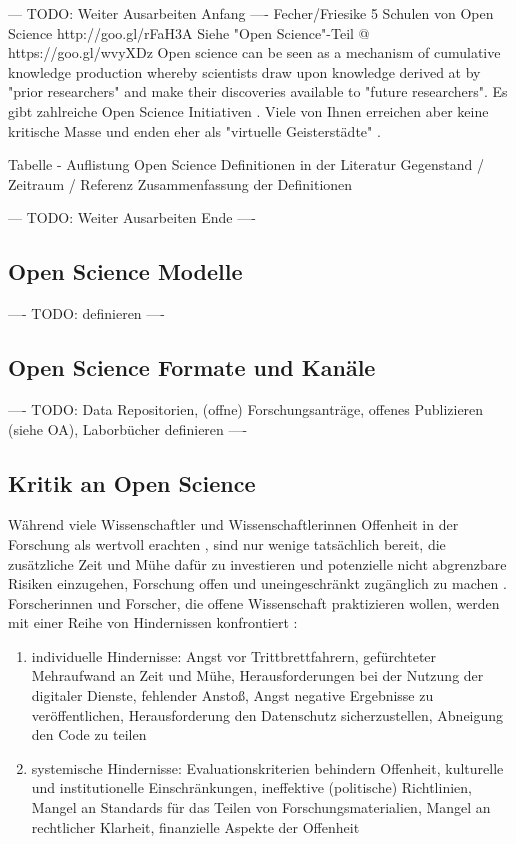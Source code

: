 --- TODO: Weiter Ausarbeiten Anfang ----
Fecher/Friesike 5 Schulen von Open Science http://goo.gl/rFaH3A
Siehe "Open Science"-Teil @ https://goo.gl/wvyXDz
Open science can be seen as a mechanism of cumulative knowledge production whereby scientists draw upon knowledge derived at by "prior researchers" and make their discoveries available to "future researchers". \cite{Mukherjee_2009}
Es gibt zahlreiche Open Science Initiativen \cite{Scheliga_2014}. Viele von Ihnen erreichen aber keine kritische Masse \cite{wrap_2010} und enden eher als "virtuelle Geisterstädte" \cite{Nielsen_2011}.

Tabelle - Auflistung Open Science Definitionen in der Literatur
Gegenstand / Zeitraum / Referenz
Zusammenfassung der Definitionen

--- TODO: Weiter Ausarbeiten Ende ----

\subsection{Open Science Modelle}
---- TODO: definieren ----

\subsection{Open Science Formate und Kanäle}

---- TODO: Data Repositorien, (offne) Forschungsanträge, offenes Publizieren (siehe OA), Laborbücher definieren ----

\subsection{Kritik an Open Science}

Während viele Wissenschaftler und Wissenschaftlerinnen Offenheit in der Forschung als wertvoll erachten \cite{suchen}, sind nur wenige tatsächlich bereit, die zusätzliche Zeit und Mühe dafür zu investieren und potenzielle nicht abgrenzbare Risiken einzugehen, Forschung offen und uneingeschränkt zugänglich zu machen \cite{Scheliga_2014} \cite{Procter_2010}. Forscherinnen und Forscher, die offene Wissenschaft praktizieren wollen, werden mit einer Reihe von Hindernissen konfrontiert \cite{Scheliga_2014}:
\begin{enumerate}
\item individuelle Hindernisse: Angst vor Trittbrettfahrern, gefürchteter Mehraufwand an Zeit und Mühe, Herausforderungen bei der Nutzung der digitaler Dienste, fehlender Anstoß, Angst negative Ergebnisse zu veröffentlichen, Herausforderung den Datenschutz sicherzustellen, Abneigung den Code zu teilen
\item systemische Hindernisse: Evaluationskriterien behindern Offenheit, kulturelle und institutionelle Einschränkungen, ineffektive (politische) Richtlinien, Mangel an Standards für das Teilen von Forschungsmaterialien, Mangel an rechtlicher Klarheit, finanzielle Aspekte der Offenheit
\end{enumerate}

